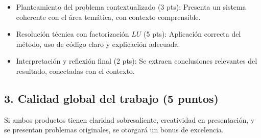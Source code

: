 \documentclass[a4,11pt]{aleph-notas}
\begin{document}
\begin{itemize}[leftmargin=*]
    \item {Planteamiento del problema contextualizado} (3 pts):  
    Presenta un sistema coherente con el área temática, con contexto comprensible.

    \item {Resolución técnica con factorización $LU$} (5 pts):  
    Aplicación correcta del método, uso de código claro y explicación adecuada.

    \item {Interpretación y reflexión final} (2 pts):  
    Se extraen conclusiones relevantes del resultado, conectadas con el contexto.
\end{itemize}

\subsection*{3. Calidad global del trabajo (5 puntos)}  

Si ambos productos tienen claridad sobresaliente, creatividad en presentación, y se presentan problemas originales, se otorgará un bonus de excelencia.
\end{document}
